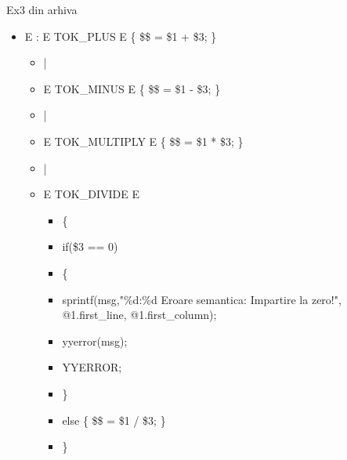 \documentclass[pdf]{beamer}
\begin{document}
\begin{frame}{Ex3 din arhiva}
\begin{itemize}
	\item[]
		\scriptsize E : E TOK\_PLUS E \{ \$\$ = \$1 + \$3; \}
	
			\begin{itemize}
				\item[]
				 \scriptsize |
	
				\item[]
				 \scriptsize E TOK\_MINUS E \{ \$\$ = \$1 - \$3; \}
	
				\item[]
				\scriptsize |
	
				\item[]
				\scriptsize E TOK\_MULTIPLY E \{ \$\$ = \$1 * \$3; \}
	
				\item[]
				\scriptsize |
	
				\item[]
				\scriptsize E TOK\_DIVIDE E
				
				\begin{itemize}
					\item[]
					\scriptsize \{
						
					\item[]
					\hspace{0.5cm}if(\$3 == 0) 
						
					\item[]
					\hspace{0.5cm}\{

					\item[]
					\hspace{1cm}sprintf(msg,"\%d:\%d Eroare semantica: Impartire la zero!", @1.first\_line, @1.first\_column);

					\item[]
					\hspace{1cm}yyerror(msg);

					\item[]
					\hspace{1cm}YYERROR;
		
					\item[]
					\hspace{0.5cm}\}
		
					\item[]
					\hspace{0.5cm}else \{ \$\$ = \$1 / \$3; \} 

					\item[]
					\}
				\end{itemize}
	

\end{itemize}
\end{itemize}
\end{frame}
\end{document}
